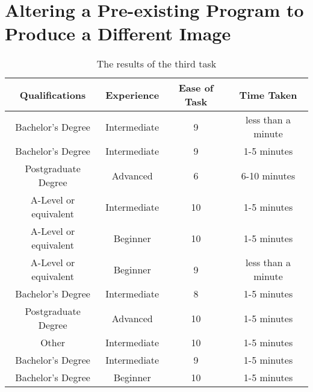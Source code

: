 \documentclass[../main.tex]{subfiles}
\begin{document}
        \section*{Altering a Pre-existing Program to Produce a Different Image}
            \begin{table}[H]
                \centering
                \begin{tabular}{c|c|c|c}
                    \textbf{Qualifications} & \textbf{Experience} & \textbf{Ease of Task} & \textbf{Time Taken} \\
                    \hline
                    Bachelor's Degree       & Intermediate        & 9                     & less than a minute  \\
                    Bachelor's Degree       & Intermediate        & 9                     & 1-5 minutes         \\
                    Postgraduate Degree     & Advanced            & 6                     & 6-10 minutes        \\
                    A-Level or equivalent   & Intermediate        & 10                    & 1-5 minutes         \\
                    A-Level or equivalent   & Beginner            & 10                    & 1-5 minutes         \\
                    A-Level or equivalent   & Beginner            & 9                     & less than a minute  \\
                    Bachelor's Degree       & Intermediate        & 8                     & 1-5 minutes         \\
                    Postgraduate Degree     & Advanced            & 10                    & 1-5 minutes         \\
                    Other                   & Intermediate        & 10                    & 1-5 minutes         \\
                    Bachelor's Degree       & Intermediate        & 9                     & 1-5 minutes         \\
                    Bachelor's Degree       & Beginner            & 10                    & 1-5 minutes         \\
                \end{tabular}
                \caption{The results of the third task}
            \end{table}
\end{document}
